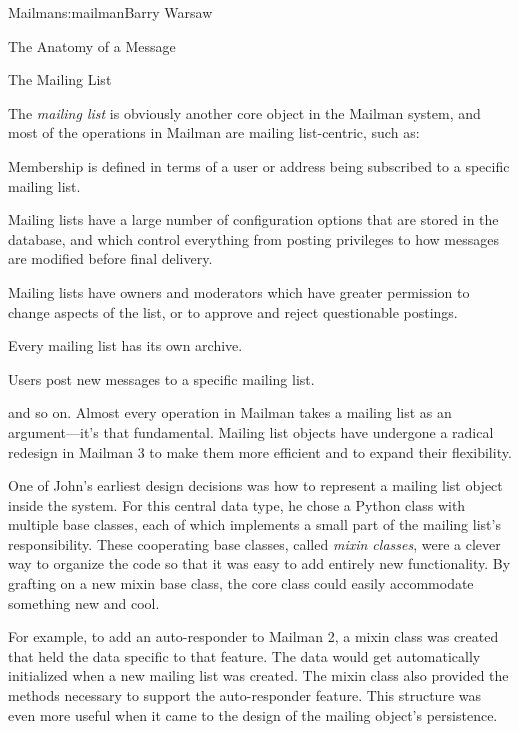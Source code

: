 \begin{aosachapter}{Mailman}{s:mailman}{Barry Warsaw}
\begin{aosasect1}{The Anatomy of a Message}
\end{aosasect1}

\begin{aosasect1}{The Mailing List}

The \emph{mailing list} is obviously another core object in the
Mailman system, and most of the operations in Mailman are mailing
list-centric, such as:

\begin{aosaitemize}

\item Membership is defined in terms of a user or address being
  subscribed to a specific mailing list.

\item Mailing lists have a large number of configuration options that
  are stored in the database, and which control everything from
  posting privileges to how messages are modified before final
  delivery.

\item Mailing lists have owners and moderators which have greater
  permission to change aspects of the list, or to approve and reject
  questionable postings.

\item Every mailing list has its own archive.

\item Users post new messages to a specific mailing list.

\end{aosaitemize}

\noindent
and so on.  Almost every operation in Mailman takes a mailing list as
an argument---it's that fundamental.  Mailing list objects have
undergone a radical redesign in Mailman 3 to make them more efficient
and to expand their flexibility.

One of John's earliest design decisions was how to represent a mailing
list object inside the system.  For this central data type, he chose a
Python class with multiple base classes, each of which implements a
small part of the mailing list's responsibility.  These cooperating
base classes, called \emph{mixin classes}, were a clever way to
organize the code so that it was easy to add entirely new
functionality.  By grafting on a new mixin base class, the core
 class could easily accommodate something new and cool.

For example, to add an auto-responder to Mailman 2, a mixin class was
created that held the data specific to that feature. The data would get
automatically initialized when a new mailing list was created.  The
mixin class also provided the methods necessary to support the
auto-responder feature.  
This structure was even more useful when it came to the design of the
mailing  object's persistence.  


\end{aosasect1}
\end{aosachapter}
